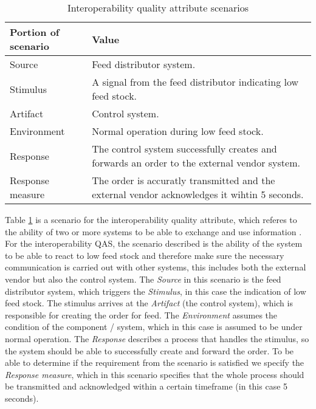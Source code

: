 \documentclass[conference]{IEEEtran}
\begin{document}
\begin{table}[h]
    \renewcommand{\arraystretch}{1.3}
    \caption{Interoperability quality attribute scenarios}
    \label{interoperability}
    \centering
    \begin{tabularx}{\columnwidth}{>{\hsize=0.3\hsize}X>{\hsize=0.7\hsize}X}
        \hline
        \textbf{Portion of scenario} & \textbf{Value}                                                                               \\
        \hline
        Source                       & Feed distributor system.                                                                     \\
        Stimulus                     & A signal from the feed distributor indicating low feed stock.                                \\
        Artifact                     & Control system.                                                                              \\
        Environment                  & Normal operation during low feed stock.                                                      \\
        Response                     & The control system successfully creates and forwards an order to the external vendor system. \\
        Response measure             & The order is accuratly transmitted and the external vendor acknowledges it wihtin 5 seconds. \\
        \hline
    \end{tabularx}
\end{table}

Table \ref{interoperability} is a scenario for the interoperability quality attribute, which referes to the ability of two or more systems to be able to exchange and use information \cite{brownsword_2004}.
For the interoperability QAS, the scenario described is the ability of the system to be able to react to low feed stock and therefore make sure the necessary communication is carried out with other systems, this includes both the external vendor but also the control system.
The \textit{Source} in this scenario is the feed distributor system, which triggers the \textit{Stimulus}, in this case the indication of low feed stock. The stimulus arrives at the \textit{Artifact} (the control system), which is responsible for creating the order for feed. The \textit{Environment} assumes the condition of the component / system, which in this case is assumed to be under normal operation.
The \textit{Response} describes a process that handles the stimulus, so the system should be able to successfully create and forward the order. To be able to determine if the requirement from the scenario is satisfied we specify the \textit{Response measure}, which in this scenario specifies that the whole process should be transmitted and acknowledged within a certain timeframe (in this case 5 seconds). \newline
\end{document}
